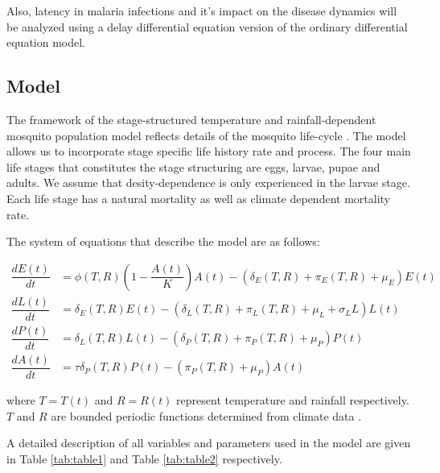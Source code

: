\documentclass[12pt,a4paper,titlepage]{article}
\begin{document}
Also, latency in malaria infections and it's impact on the disease dynamics will be analyzed using a delay differential equation version of the ordinary differential equation model.


\subsection{Model}
The framework of the stage-structured temperature and rainfall-dependent mosquito population model reflects details of the mosquito life-cycle \cite{abdelrazec2017mathematical, hamdan2020effect, beck2013effect, ewing2016modelling}. The model allows us to incorporate stage specific life history rate and process. The four main life stages that constitutes the stage structuring are eggs, larvae, pupae and adults. We assume that desity-dependence is only experienced in the larvae stage. Each life stage has a natural mortality as well as climate dependent mortality rate.  

The system of equations that describe the model are as follows:



\begin{subequations}
	\label{mosquito_model}
	\begin{align}
\dfrac{dE(t)}{dt} &= \phi (T, R)\left(1-\dfrac{A(t)}{K}\right)A(t) - \left( \delta_E(T, R)  + \pi_E(T, R)+ \mu_E\right)E(t)\\
\dfrac{dL(t)}{dt} &= \delta_E(T, R)E(t) - \left( \delta_L(T, R)  + \pi_L(T, R)+ \mu_L + \sigma_L L\right)L(t)\\
\dfrac{dP(t)}{dt} &= \delta_L(T, R)L(t) - \left( \delta_P(T, R)  + \pi_P(T, R)+ \mu_P \right)P(t)\\
\dfrac{dA(t)}{dt} &= \tau \delta_P(T, R)P(t) - \left( \pi_P(T, R)+ \mu_P \right)A(t)
	\end{align}
\end{subequations}

where $T = T(t)$ and $R=R(t)$ represent temperature and rainfall respectively. $T$ and $R$ are bounded periodic functions determined from climate data \cite{abdelrazec2017mathematical}.

A detailed description of all variables and parameters used in the model are given in Table \ref{tab:table1} and Table \ref{tab:table2} respectively. 
\end{document}
